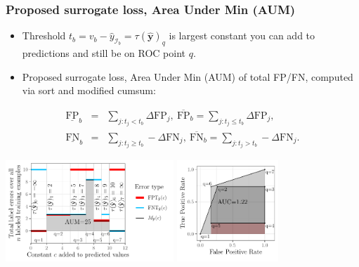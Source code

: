 \documentclass[t]{beamer}
\begin{document}
\begin{frame}
  \frametitle{Proposed surrogate loss, Area Under Min (AUM)}
  \begin{itemize}
  \item Threshold
    $t_b= v_b - \hat y_{\mathcal I_b}=\tau(\mathbf{\hat y})_q$ is largest constant you can add to predictions and still be on ROC point $q$.
  \item Proposed surrogate loss, Area Under Min (AUM) of total FP/FN,
    computed via sort and modified cumsum:
  \end{itemize}
\begin{eqnarray*}
  \underline{\text{FP}}_b &=& \sum_{j: t_j < t_b} \Delta\text{FP}_j,\ 
  \overline{\text{FP}}_b = \sum_{j: t_j \leq t_b} \Delta\text{FP}_j, \\
  \underline{\text{FN}}_b &=& \sum_{j: t_j \geq t_b} - \Delta\text{FN}_j,\ 
  \overline{\text{FN}}_b = \sum_{j: t_j > t_b} - \Delta\text{FN}_j.
\end{eqnarray*}

  \includegraphics[height=1.5in]{figure-more-than-one-more-aum}
  \includegraphics[height=1.5in]{figure-more-than-one-more-auc}

\end{frame}
\end{document}
